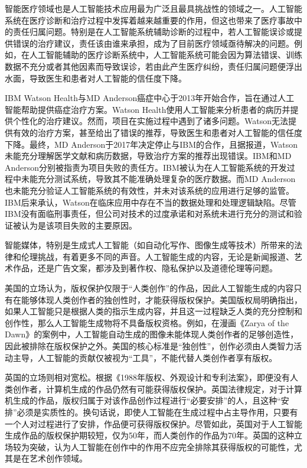 智能医疗领域也是人工智能技术应用最为广泛且最具挑战性的领域之一。人工智能系统在医疗诊断和治疗过程中发挥着越来越重要的作用，但这也带来了医疗事故中的责任归属问题。特别是在人工智能系统辅助诊断的过程中，若人工智能误诊或提供错误的治疗建议，责任该由谁来承担，成为了目前医疗领域亟待解决的问题。例如，在人工智能辅助的医疗诊断系统中，人工智能系统可能会因为算法错误、训练数据不充分或者其他因素而导致误诊，若由此产生医疗纠纷，责任归属问题便浮出水面，导致医生和患者对人工智能的信任度下降。

IBM Watson Health与MD Anderson癌症中心于2013年开始合作，旨在通过人工智能帮助提供癌症治疗方案。Watson Health使用人工智能来分析患者的病历并提供个性化的治疗建议。然而，项目在实施过程中遇到了诸多问题。Watson无法提供有效的治疗方案，甚至给出了错误的推荐，导致医生和患者对人工智能的信任度下降。最终，MD Anderson于2017年决定停止与IBM的合作，且据报道，Watson未能充分理解医学文献和病历数据，导致治疗方案的推荐出现错误。IBM和MD Anderson分别被指责为项目失败的责任方。IBM被认为在人工智能系统的开发过程中未能充分测试系统，导致其不能准确处理复杂的医疗数据。而MD Anderson也未能充分验证人工智能系统的有效性，并未对该系统的应用进行足够的监管。IBM后来承认，Watson在临床应用中存在不当的数据处理和处理逻辑缺陷。尽管IBM没有面临刑事责任，但公司对技术的过度承诺和对系统未进行充分的测试和验证被认为是该项目失败的主要原因。

智能媒体，特别是生成式人工智能（如自动化写作、图像生成等技术）所带来的法律和伦理挑战，有着更多不同的声音。人工智能生成的内容，无论是新闻报道、艺术作品，还是广告文案，都涉及到著作权、隐私保护以及道德伦理等问题。

美国的立场认为，版权保护仅限于“人类创作”的作品，因此人工智能生成的内容只有在能够体现人类创作者的独创性时，才能获得版权保护。美国版权局明确指出，如果人工智能只是根据人类的指示生成内容，并且这一过程缺乏人类的充分控制和创作性，那么人工智能生成物将不具备版权资格。例如，在漫画《Zarya of the Dawn》的案例中，人工智能自动生成的图像未能体现人类创作者的足够创造性，因此被排除在版权保护之外。美国的核心标准是“独创性”，创作必须由人类智力活动主导，人工智能的贡献仅被视为“工具”，不能代替人类创作者享有版权。

英国的立场则相对宽松。根据《1988年版权、外观设计和专利法案》，即便没有人类创作者，计算机生成的作品仍然有可能获得版权保护。英国法律规定，对于计算机生成的作品，版权归属于对该作品创作过程进行“必要安排”的人，且这种“安排”必须是实质性的。换句话说，即使人工智能在生成过程中占主导作用，只要有一个人对过程进行了安排，作品便可获得版权保护。尽管如此，英国对于人工智能生成作品的版权保护期较短，仅为50年，而人类创作的作品为70年。英国的这种立场较为突破，认为人工智能在创作中的作用不应完全排除其获得版权的可能性，尤其是在艺术创作领域。

